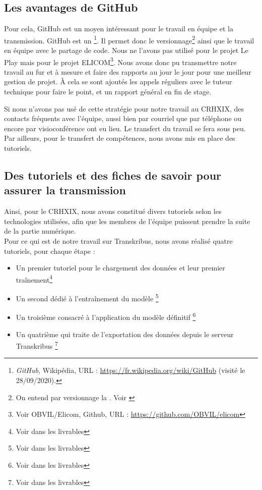 \subsection{Les avantages de GitHub}

Pour cela, GitHub est un moyen intéressant pour le travail en équipe et la transmission. GitHub est un \footnote{\emph{GitHub}, Wikipédia, URL : \url{https://fr.wikipedia.org/wiki/GitHub} (visité le 28/09/2020).}. Il permet donc le versionnage\footnote{On entend par versionnage la . Voir \cite{versionnage}} ainsi que le travail en équipe avec le partage de code.
Nous ne l'avons pas utilisé pour le projet Le Play mais pour le projet ELICOM\footnote{Voir OBVIL/Elicom, Github, URL : \url{https://github.com/OBVIL/elicom}}. Nous avons donc pu transmettre notre travail au fur et à mesure et faire des rapports au jour le jour pour une meilleur gestion de projet. À cela se sont ajoutés les appels réguliers avec le tuteur technique pour faire le point, et un rapport général en fin de stage.

Si nous n'avons pas usé de cette stratégie pour notre travail au CRHXIX, des contacts fréquents avec l'équipe, aussi bien par courriel que par téléphone ou encore par visioconférence ont eu lieu. Le transfert du travail se fera sous peu. Par ailleurs, pour le transfert de compétences, nous avons mis en place des tutoriels.

\subsection{Des tutoriels et des fiches de savoir pour assurer la transmission}

Ainsi, pour le CRHXIX, nous avons constitué divers tutoriels selon les technologies utilisées, afin que les membres de l'équipe puissent prendre la suite de la partie numérique.\\

Pour ce qui est de notre travail sur Transkribus, nous avons réalisé quatre tutoriels, pour chaque étape :

\begin{itemize}
    \item Un premier tutoriel pour le chargement des données et leur premier traînement\footnote{Voir dans les livrables }
    \item Un second dédié à l'entraînement du modèle \footnote{Voir dans les livrables }
    \item Un troisième consacré à l'application du modèle définitif \footnote{Voir dans les livrables }
    \item Un quatrième qui traite de l'exportation des données depuis le serveur Transkribus \footnote{Voir dans les livrables }
\end{itemize}

